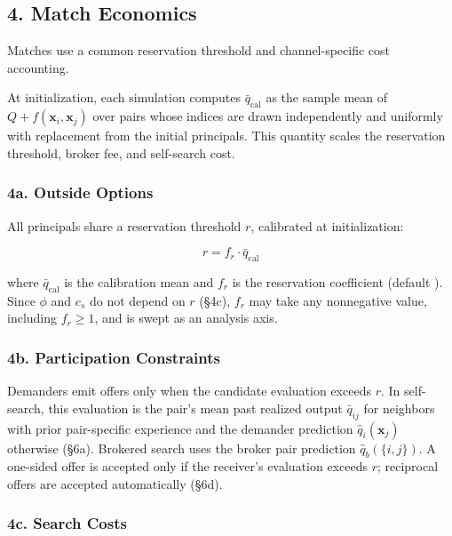 \documentclass[11pt]{article}
\begin{document}
\subsection{4. Match Economics}\label{match-economics}

Matches use a common reservation threshold and channel-specific cost accounting.

At initialization, each simulation computes \(\bar{q}_{\text{cal}}\) as the sample mean of \(Q+f(\mathbf{x}_i,\mathbf{x}_j)\) over  pairs whose indices are drawn independently and uniformly with replacement from the initial principals. This quantity scales the reservation threshold, broker fee, and self-search cost.

\subsubsection{4a. Outside Options}\label{a.-outside-options}

All principals share a reservation threshold \(r\), calibrated at initialization:

\[r = f_r \cdot \bar{q}_{\text{cal}}\]

where \(\bar{q}_{\text{cal}}\) is the calibration mean and \(f_r\) is the reservation coefficient (default ). Since \(\phi\) and \(c_s\) do not depend on \(r\) (§4c), \(f_r\) may take any nonnegative value, including \(f_r \geq 1\), and is swept as an analysis axis.

\subsubsection{4b. Participation Constraints}\label{b.-participation-constraints}

Demanders emit offers only when the candidate evaluation exceeds \(r\). In self-search, this evaluation is the pair's mean past realized output \(\bar q_{ij}\) for neighbors with prior pair-specific experience and the demander prediction \(\hat q_i(\mathbf x_j)\) otherwise (§6a). Brokered search uses the broker pair prediction \(\hat q_b(\{i,j\})\). A one-sided offer is accepted only if the receiver's evaluation exceeds \(r\); reciprocal offers are accepted automatically (§6d).

\subsubsection{4c. Search Costs}\label{c.-search-costs}
\end{document}
